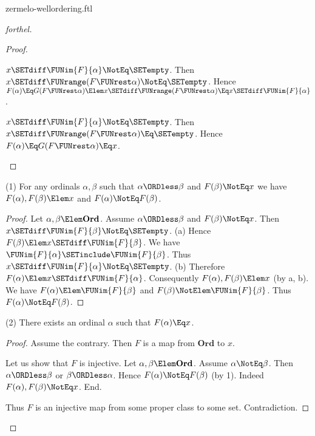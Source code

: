 \documentclass{stex}
\newcommand\Ord{\textbf{Ord}}
\begin{document}
\begin{smodule}{zermelo-wellordering.ftl}
\begin{proof}[forthel]
\begin{proof}
    \begin{case}{$x \SETdiff \FUNim{F}{\alpha} \NotEq \SETempty$.}
      Then $x \SETdiff \FUNrange(F \FUNrest \alpha) \NotEq \SETempty$.
      Hence $F(\alpha)
        \Eq G(F \FUNrest \alpha)
        \Elem\linebreak x \SETdiff \FUNrange(F \FUNrest \alpha)
        \Eq x \SETdiff \FUNim{F}{\alpha}$.
    \end{case}

    \begin{case}{$x \SETdiff \FUNim{F}{\alpha} \NotEq \SETempty$.}
      Then $x \SETdiff \FUNrange(F \FUNrest \alpha) \Eq \SETempty$.
      Hence $F(\alpha)
        \Eq G(F \FUNrest \alpha)
        \Eq\linebreak x$.
    \end{case}
  \end{proof}

  (1) For any ordinals $\alpha, \beta$ such that $\alpha \ORDless \beta$ and $F(\beta) \NotEq x$ we have $F(\alpha),\linebreak F(\beta) \Elem x$ and $F(\alpha) \NotEq F(\beta)$.
  \begin{proof}
    Let $\alpha, \beta \Elem \Ord$.
    Assume $\alpha \ORDless \beta$ and $F(\beta) \NotEq x$.
    Then $x \SETdiff \FUNim{F}{\beta} \NotEq \SETempty$.
    (a) Hence $F(\beta) \Elem x \SETdiff \FUNim{F}{\beta}$.
    We have $\FUNim{F}{\alpha} \SETinclude \FUNim{F}{\beta}$.
    Thus $x \SETdiff \FUNim{F}{\alpha} \NotEq \SETempty$.
    (b) Therefore $F(\alpha) \Elem x \SETdiff \FUNim{F}{\alpha}$.
    Consequently $F(\alpha), F(\beta) \Elem x$ (by a, b).
    We have $F(\alpha) \Elem \FUNim{F}{\beta}$ and $F(\beta) \NotElem \FUNim{F}{\beta}$.
    Thus $F(\alpha) \NotEq F(\beta)$.
  \end{proof}

  (2) There exists an ordinal $\alpha$ such that $F(\alpha) \Eq x$.
  \begin{proof}
    Assume the contrary.
    Then $F$ is a map from $\Ord$ to $x$.

    Let us show that $F$ is injective.
      Let $\alpha, \beta \Elem \Ord$.
      Assume $\alpha \NotEq \beta$.
      Then $\alpha \ORDless \beta$ or $\beta \ORDless \alpha$.
      Hence $F(\alpha) \NotEq F(\beta)$ (by 1).
      Indeed $F(\alpha), F(\beta) \NotEq x$.
    End.

    Thus $F$ is an injective map from some proper class to some set.
    Contradiction.
  \end{proof}


\end{proof}
\end{smodule}
\end{document}
